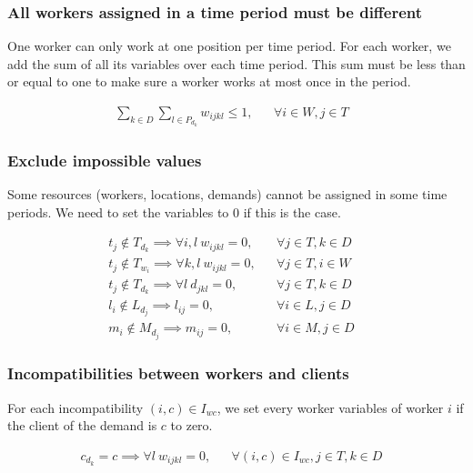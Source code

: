 \documentclass[../../thesis.tex]{subfiles}
\begin{document}
\subsubsection{All workers assigned in a time period must be different}

One worker can only work at one position per time period. For each worker, we add the sum of all its variables 
over each time period. This sum must be less than or equal to one to make sure a worker works at most once in the period.

\begin{align}
  \sum_{k \in D} \sum_{l \in P_{d_k}} w_{ijkl} \leq 1, && \forall i \in W, j \in T & \label{wc2} 
\end{align}


\subsubsection{Exclude impossible values}

Some resources (workers, locations, demands) cannot be assigned in some time periods. We need to set the variables to 0 if this is the case.

\begin{align}
  t_j \notin T_{d_k} \implies \forall i, l \ w_{ijkl} = 0,  && \forall j \in T , k \in D &\label{wc3} \\
  t_j \notin T_{w_i} \implies \forall k, l \ w_{ijkl} = 0, && \forall j \in T, i \in W &\label{wc4} \\
  t_j \notin T_{d_k} \implies \forall l \ d_{jkl} = 0,  && \forall j \in T , k \in D &\label{sc1} \\ 
  l_i \notin L_{d_j} \implies l_{ij} = 0, && \forall i \in L, j \in D& \label{lc1} \\ 
  m_i \notin M_{d_j} \implies m_{ij} = 0, && \forall i \in M, j \in D& \label{mc1} 
\end{align}


\subsubsection{Incompatibilities between workers and clients}

For each incompatibility $(i, c) \in I_{wc}$, we set every worker variables of worker $i$ if the client of the 
demand is $c$ to zero.

\begin{align}
  c_{d_k} = c \implies \forall l \ w_{ijkl} = 0, && \forall {(i, c) \in I_{wc}}, j \in T, k \in D &\label{wc6}
\end{align}
\end{document}
